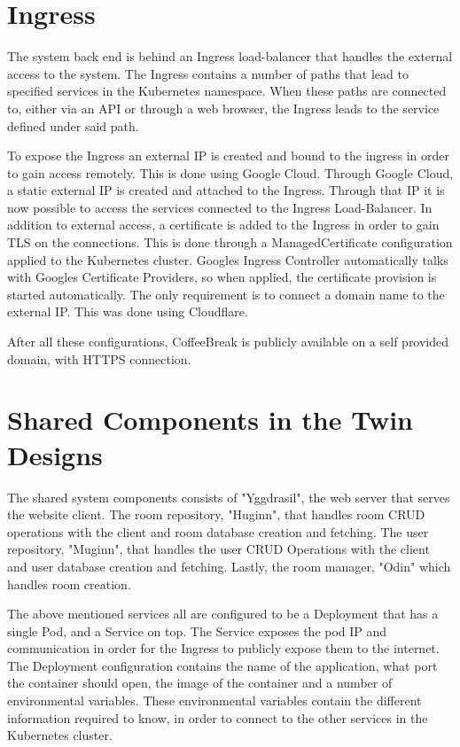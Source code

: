 \section{Ingress}

The system back end is behind an Ingress load-balancer that handles the external access to the system. The Ingress contains a number of paths that lead to specified services in the Kubernetes namespace. When these paths are connected to, either via an API or through a web browser, the Ingress leads to the service defined under said path. 

To expose the Ingress an external IP is created and bound to the ingress in order to gain access remotely. This is done using Google Cloud. Through Google Cloud, a static external IP is created and attached to the Ingress. Through that IP it is now possible to access the services connected to the Ingress Load-Balancer. 
In addition to external access, a certificate is added to the Ingress in order to gain TLS on the connections. This is done through a ManagedCertificate configuration applied to the Kubernetes cluster. Googles Ingress Controller automatically talks with Googles Certificate Providers, so when applied, the certificate provision is started automatically. The only requirement is to connect a domain name to the external IP. This was done using Cloudflare.

After all these configurations, CoffeeBreak is publicly available on a self provided domain, with HTTPS connection.

\section{Shared Components in the Twin Designs}

The shared system components consists of "Yggdrasil", the web server that serves the website client. The room repository, "Huginn", that handles room CRUD operations with the client and room database creation and fetching. The user repository, "Muginn", that handles the user CRUD Operations with the client and user database creation and fetching. Lastly, the room manager, "Odin" which handles room creation. 

The above mentioned services all are configured to be a Deployment that has a single Pod, and a Service on top. The Service exposes the pod IP and communication in order for the Ingress to publicly expose them to the internet. The Deployment configuration contains the name of the application, what port the container should open, the image of the container and a number of environmental variables. These environmental variables contain the different information required to know, in order to connect to the other services in the Kubernetes cluster. 

